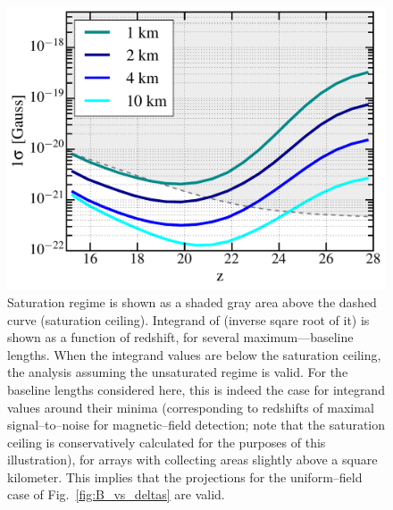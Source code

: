 \begin{figure}
\centering
\includegraphics[width=.4\textwidth,keepaspectratio=true]{sigmaB0_vs_z.pdf}
\caption{Saturation regime is shown as a shaded gray area above the dashed curve (saturation ceiling). Integrand of \eq{\ref{eq:fisher_patch}} (inverse sqare root of it) is shown as a function of redshift, for several maximum---baseline lengths.  When the integrand values are below the saturation ceiling, the analysis assuming the unsaturated regime is valid. For the baseline lengths considered here, this is indeed the case for integrand values around their minima (corresponding to redshifts of maximal signal--to--noise for magnetic--field detection; note that the saturation ceiling is conservatively calculated for the purposes of this illustration), for arrays with collecting areas slightly above a square kilometer. This implies that the projections for the uniform--field case of Fig.~\ref{fig:B_vs_deltas} are valid. \label{fig:Bsat}}
\end{figure}
